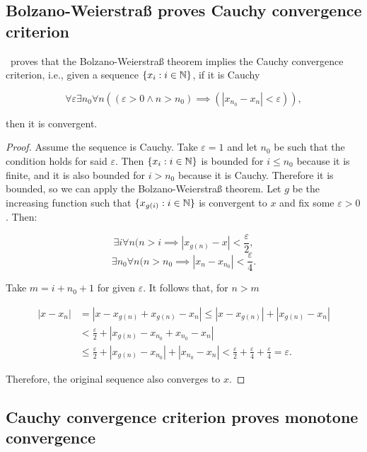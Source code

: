 \documentclass[../main.tex]{memoir}
\begin{document}
\subsection{Bolzano-Weierstra{\ss} proves Cauchy convergence criterion}

\begin{theorem}
  \label{thm:bw-cc}
  \rca\ proves that the Bolzano-Weierstra{\ss} theorem implies the Cauchy convergence criterion, i.e., given a sequence $\{x_i: i \in \mathbb{N}\}$, if it is Cauchy

  \[ \forall \varepsilon \exists n_0 \forall n ((\varepsilon > 0 \land n > n_0) \implies (|x_{n_0} - x_n| < \varepsilon)), \]

  then it is convergent.
\end{theorem}
\begin{proof}
  Assume the sequence is Cauchy. Take $\varepsilon = 1$ and let $n_0$ be such that the condition holds for said $\varepsilon$. Then $\{x_i: i \in \mathbb{N}\}$ is bounded for $i \le n_0$ because it is finite, and it is also bounded for $i > n_0$ because it is Cauchy. Therefore it is bounded, so we can apply the Bolzano-Weierstra{\ss} theorem. Let $g$ be the increasing function such that $\{x_{g(i)}: i \in \mathbb{N}\}$ is convergent to $x$ and fix some $\varepsilon > 0$. Then:

  \[ \exists i \forall n (n > i \implies |x_{g(n)} - x| < \frac{\varepsilon}{2}, \]
  \[ \exists n_0 \forall n (n > n_0 \implies |x_n - x_{n_0}| < \frac{\varepsilon}{4}. \]

  Take $m = i + n_0 + 1$ for given $\varepsilon$. It follows that, for $n > m$

  \begin{equation*}
    \begin{split}
      |x - x_n| & = |x - x_{g(n)} + x_{g(n)} - x_n| \le |x - x_{g(n)}| + |x_{g(n)} - x_n| \\
      & < \frac{\varepsilon}{2} + |x_{g(n)} - x_{n_0} + x_{n_0} - x_n| \\
      & \le \frac{\varepsilon}{2} + |x_{g(n)} - x_{n_0}| + |x_{n_0} - x_n| < \frac{\varepsilon}{2} + \frac{\varepsilon}{4} + \frac{\varepsilon}{4} = \varepsilon.
    \end{split}
  \end{equation*}

  Therefore, the original sequence also converges to $x$.
\end{proof}

\subsection{Cauchy convergence criterion proves monotone convergence}
\end{document}
